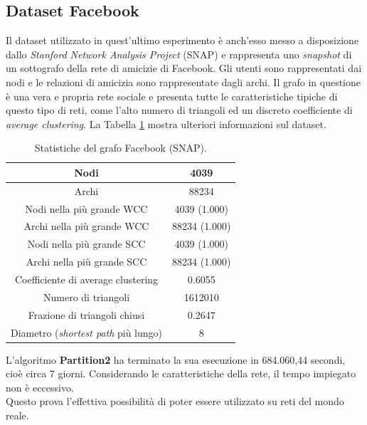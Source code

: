 \subsection{Dataset Facebook}
Il dataset utilizzato in quest'ultimo esperimento è anch'esso messo a disposizione dallo \textit{Stanford Network Analysis Project} (SNAP) \cite{snapnets} e rappresenta uno \textit{snapshot} di un sottografo della rete di amicizie di Facebook. Gli utenti sono rappresentati dai nodi e le relazioni di amicizia sono rappresentate dagli archi. Il grafo in questione è una vera e propria rete sociale e presenta tutte le caratteristiche tipiche di questo tipo di reti, come l'alto numero di triangoli ed un discreto coefficiente di \textit{average clustering}. La Tabella \ref{tab:facebook} mostra ulteriori informazioni sul dataset.\\
\begin{table}[h!]
	\centering
	\begin{tabular}{|c|c|}
		\hline
		Nodi& 4039\\ \hline
		Archi& 88234\\ \hline
		Nodi nella più grande WCC& 4039 (1.000)\\ \hline
		Archi nella più grande WCC& 88234 (1.000)\\ \hline
		Nodi nella più grande SCC& 4039 (1.000)\\ \hline
		Archi nella più grande SCC& 88234 (1.000)\\ \hline
		Coefficiente di average clustering& 0.6055\\ \hline
		Numero di triangoli& 1612010\\ \hline
		Frazione di triangoli chiusi& 0.2647\\ \hline
		Diametro (\textit{shortest path} più lungo)& 8\\ \hline
	\end{tabular}
	\caption{Statistiche del grafo Facebook (SNAP).}\label{tab:facebook}
\end{table}
L'algoritmo \textbf{Partition2} ha terminato la sua esecuzione in 684.060,44 secondi, cioè circa 7 giorni. Considerando le caratteristiche della rete, il tempo impiegato non è eccessivo.\\
Questo prova l'effettiva possibilità di poter essere utilizzato su reti del mondo reale.
\clearpage